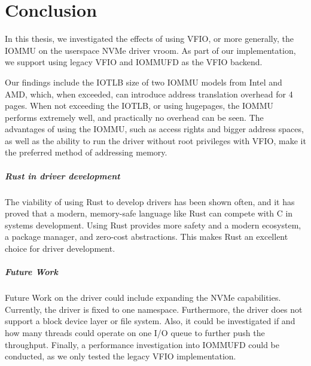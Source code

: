 \chapter{Conclusion}
In this thesis, we investigated the effects of using VFIO, or more generally, the IOMMU on the userspace NVMe driver vroom.
As part of our implementation, we support using legacy VFIO and IOMMUFD as the VFIO backend.

Our findings include the IOTLB size of two IOMMU models from Intel and AMD, which, when exceeded, can introduce address translation overhead for \qty{4}{\kibi\byte} pages.
When not exceeding the IOTLB, or using hugepages, the IOMMU performs extremely well, and practically no overhead can be seen.
The advantages of using the IOMMU, such as access rights and bigger address spaces, as well as the ability to run the driver without root privileges with VFIO, make it the preferred method of addressing memory.

\paragraph{Rust in driver development}
The viability of using Rust to develop drivers has been shown often, and it has proved that a modern, memory-safe language like Rust can compete with C in systems development. Using Rust provides more safety and a modern ecosystem, a package manager, and zero-cost abstractions. This makes Rust an excellent choice for driver development.

\paragraph{Future Work}
Future Work on the driver could include expanding the NVMe capabilities. Currently, the driver is fixed to one namespace. Furthermore, the driver does not support a block device layer or file system.
Also, it could be investigated if and how many threads could operate on one I/O queue to further push the throughput. Finally, a performance investigation into IOMMUFD could be conducted, as we only tested the legacy VFIO implementation.